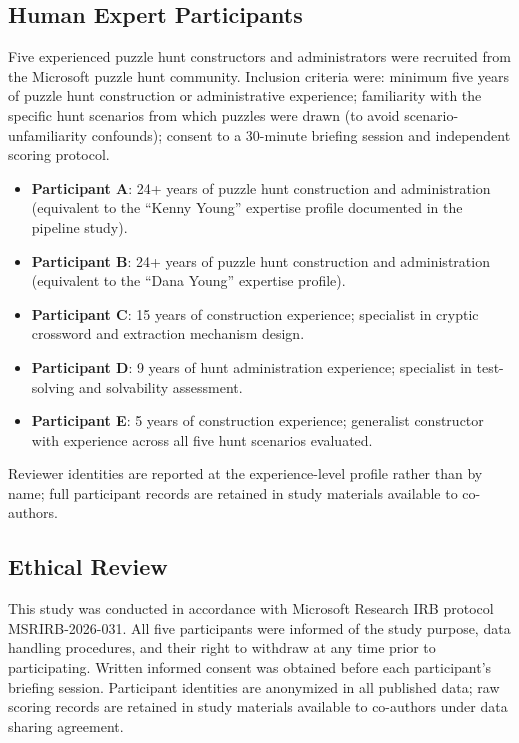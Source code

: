 \subsection{Human Expert Participants}

Five experienced puzzle hunt constructors and administrators were recruited from the Microsoft puzzle hunt community. Inclusion criteria were: minimum five years of puzzle hunt construction or administrative experience; familiarity with the specific hunt scenarios from which puzzles were drawn (to avoid scenario-unfamiliarity confounds); consent to a 30-minute briefing session and independent scoring protocol.

\begin{itemize}
  \item \textbf{Participant A}: 24+ years of puzzle hunt construction and administration (equivalent to the ``Kenny Young'' expertise profile documented in the pipeline study).
  \item \textbf{Participant B}: 24+ years of puzzle hunt construction and administration (equivalent to the ``Dana Young'' expertise profile).
  \item \textbf{Participant C}: 15 years of construction experience; specialist in cryptic crossword and extraction mechanism design.
  \item \textbf{Participant D}: 9 years of hunt administration experience; specialist in test-solving and solvability assessment.
  \item \textbf{Participant E}: 5 years of construction experience; generalist constructor with experience across all five hunt scenarios evaluated.
\end{itemize}

Reviewer identities are reported at the experience-level profile rather than by name; full participant records are retained in study materials available to co-authors.

\subsection{Ethical Review}

This study was conducted in accordance with Microsoft Research IRB protocol MSRIRB-2026-031. All five participants were informed of the study purpose, data handling procedures, and their right to withdraw at any time prior to participating. Written informed consent was obtained before each participant's briefing session. Participant identities are anonymized in all published data; raw scoring records are retained in study materials available to co-authors under data sharing agreement.

